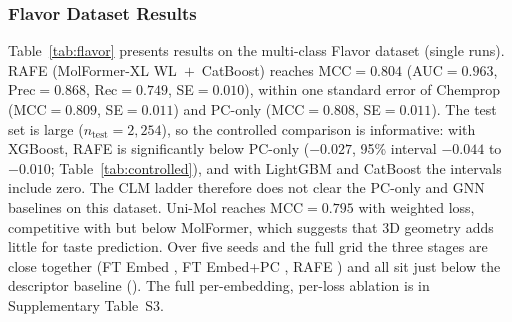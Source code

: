 \documentclass[pdflatex,sn-mathphys-num]{sn-jnl}%
\begin{document}
\subsubsection{Flavor Dataset Results}
Table~\ref{tab:flavor} presents results on the multi-class Flavor dataset (single runs). RAFE (MolFormer-XL WL~$+$~CatBoost) reaches MCC$=0.804$ (AUC$=0.963$, Prec$=0.868$, Rec$=0.749$, SE$=0.010$), within one standard error of Chemprop (MCC$=0.809$, SE$=0.011$) and PC-only (MCC$=0.808$, SE$=0.011$). The test set is large ($n_\text{test}=2{,}254$), so the controlled comparison is informative: with XGBoost, RAFE is significantly below PC-only ($-0.027$, 95\% interval $-0.044$ to $-0.010$; Table~\ref{tab:controlled}), and with LightGBM and CatBoost the intervals include zero. The CLM ladder therefore does not clear the PC-only and GNN baselines on this dataset. Uni-Mol reaches MCC$=0.795$ with weighted loss, competitive with but below MolFormer, which suggests that 3D geometry adds little for taste prediction. Over five seeds and the full grid the three stages are close together (FT Embed \mFLAVFT{}, FT Embed+PC \mFLAVFTPC{}, RAFE \mFLAVRAFE{}) and all sit just below the descriptor baseline (\mFLAVPC{}). The full per-embedding, per-loss ablation is in Supplementary Table~S3.

\begin{table}[t]
\centering
\caption{Best performing configurations on Flavor. Prec/Rec are macro-averaged; AUC is one-vs-rest macro ROC AUC.}
\label{tab:flavor}
\end{table}
\end{document}
